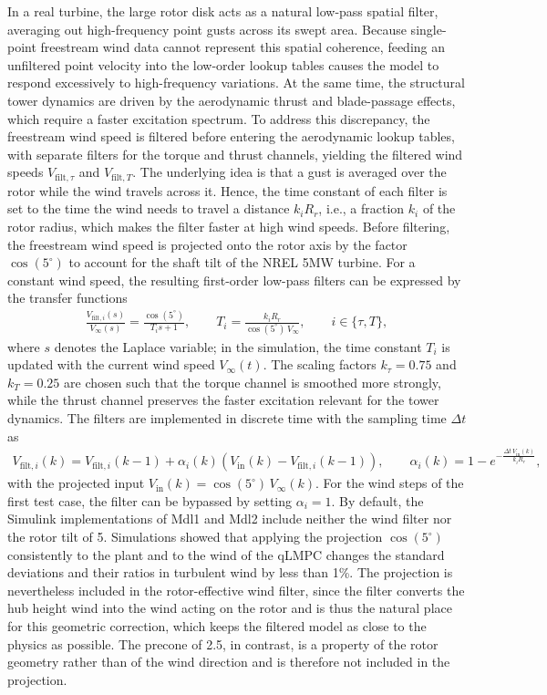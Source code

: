     In a real turbine, the large rotor disk acts as a natural low-pass spatial filter, averaging out high-frequency point gusts across its swept area. Because single-point freestream wind data cannot represent this spatial coherence, feeding an unfiltered point velocity into the low-order lookup tables causes the model to respond excessively to high-frequency variations. At the same time, the structural tower dynamics are driven by the aerodynamic thrust and blade-passage effects, which require a faster excitation spectrum. To address this discrepancy, the freestream wind speed is filtered before entering the aerodynamic lookup tables, with separate filters for the torque and thrust channels, yielding the filtered wind speeds $V_{\text{filt},\tau}$ and $V_{\text{filt},T}$. The underlying idea is that a gust is averaged over the rotor while the wind travels across it. Hence, the time constant of each filter is set to the time the wind needs to travel a distance $k_i R_r$, i.e., a fraction $k_i$ of the rotor radius, which makes the filter faster at high wind speeds. Before filtering, the freestream wind speed is projected onto the rotor axis by the factor $\cos(5^\circ)$ to account for the shaft tilt of the NREL 5MW turbine. For a constant wind speed, the resulting first-order low-pass filters can be expressed by the transfer functions
    \begin{align*}
        \frac{V_{\text{filt},i}(s)}{V_\infty(s)} = \frac{\cos(5^\circ)}{T_i s + 1}, \qquad T_i = \frac{k_i R_r}{\cos(5^\circ)\,V_\infty}, \qquad i \in \{\tau, T\},
    \end{align*}
    where $s$ denotes the Laplace variable; in the simulation, the time constant $T_i$ is updated with the current wind speed $V_\infty(t)$. The scaling factors $k_\tau = 0.75$ and $k_T = 0.25$ are chosen such that the torque channel is smoothed more strongly, while the thrust channel preserves the faster excitation relevant for the tower dynamics. The filters are implemented in discrete time with the sampling time $\Delta t$ as
    \begin{align*}
        V_{\text{filt},i}(k) = V_{\text{filt},i}(k-1) + \alpha_i(k)\left(V_{\text{in}}(k) - V_{\text{filt},i}(k-1)\right), \qquad \alpha_i(k) = 1 - e^{-\frac{\Delta t\,V_{\text{in}}(k)}{k_i R_r}},
    \end{align*}
    with the projected input $V_{\text{in}}(k) = \cos(5^\circ)\,V_\infty(k)$. For the wind steps of the first test case, the filter can be bypassed by setting $\alpha_i = 1$. By default, the Simulink implementations of Mdl1 and Mdl2 include neither the wind filter nor the rotor tilt of 5\textdegree{}. Simulations showed that applying the projection $\cos(5^\circ)$ consistently to the plant and to the wind of the qLMPC changes the standard deviations and their ratios in turbulent wind by less than 1\%. The projection is nevertheless included in the rotor-effective wind filter, since the filter converts the hub height wind into the wind acting on the rotor and is thus the natural place for this geometric correction, which keeps the filtered model as close to the physics as possible. The precone of 2.5\textdegree{}, in contrast, is a property of the rotor geometry rather than of the wind direction and is therefore not included in the projection.
    
